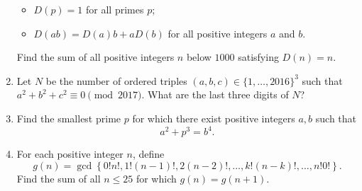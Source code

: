 \documentclass[10pt]{article}
\begin{document}
\begin{enumerate}
\begin{itemize}
\item $D(p)=1$ for all primes $p$;

\item $D(ab)=D(a)b+aD(b)$ for all positive integers $a$ and $b$.

\end{itemize}

Find the sum of all positive integers $n$ below $1000$ satisfying $D(n)=n$.

\item Let $N$ be the number of ordered triples $(a,b,c) \in \{1, \ldots, 2016\}^{3}$ such that $a^{2} + b^{2} + c^{2} \equiv 0 \pmod{2017}$. What are the last three digits of $N$?

\item Find the smallest prime $p$ for which there exist positive integers $a,b$ such that 
	\[
		a^{2} + p^{3} = b^{4}.
	\]

\item For each positive integer $n$, define \[g(n) = \gcd\left\{0! n!, 1! (n-1)!, 2 (n-2)!, \ldots, k!(n-k)!, \ldots, n! 0!\right\}.\] Find the sum of all $n \leq 25$ for which $g(n) = g(n+1)$.
\end{enumerate}
\end{document}
